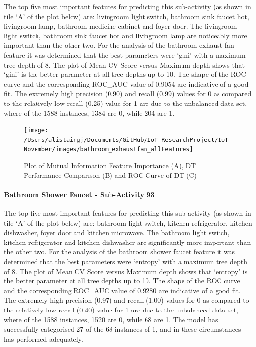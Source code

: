 \documentclass[11pt,]{article}
\let\oldparagraph\paragraph
\renewcommand{\paragraph}[1]{\oldparagraph{#1}\mbox{}}
\begin{document}
The top five most important features for predicting this sub-activity
(as shown in tile `A' of the plot below) are: livingroom light switch,
bathroom sink faucet hot, livingroom lamp, bathroom medicine cabinet and
foyer door. The livingroom light switch, bathroom sink faucet hot and
livingroom lamp are noticeably more important than the other two. For
the analysis of the bathroom exhaust fan feature it was determined that
the best parameters were `gini' with a maximum tree depth of 8. The plot
of Mean CV Score versus Maximum depth shows that `gini' is the better
parameter at all tree depths up to 10. The shape of the ROC curve and
the corresponding ROC\_AUC value of 0.9054 are indicative of a good fit.
The extremely high precision (0.90) and recall (0.99) values for 0 as
compared to the relatively low recall (0.25) value for 1 are due to the
unbalanced data set, where of the 1588 instances, 1384 are 0, while 204
are 1.

\begin{figure}[H]

{\centering \texttt{[image: /Users/alistairgj/Documents/GitHub/IoT\_ResearchProject/IoT\_November/images/bathroom\_exhaustfan\_allFeatures]} 

}

\caption{Plot of Mutual Information Feature Importance (A), DT Performance Comparison (B) and ROC Curve of DT (C)}\label{fig:unnamed-chunk-11}
\end{figure}

\hypertarget{bathroom-shower-faucet---sub-activity-93-1}{%
\paragraph{Bathroom Shower Faucet - Sub-Activity
93}\label{bathroom-shower-faucet---sub-activity-93-1}}

The top five most important features for predicting this sub-activity
(as shown in tile `A' of the plot below) are: bathroom light switch,
kitchen refrigerator, kitchen dishwasher, foyer door and kitchen
microwave. The bathroom light switch, kitchen refrigerator and kitchen
dishwasher are significantly more important than the other two. For the
analysis of the bathroom shower faucet feature it was determined that
the best parameters were `entropy' with a maximum tree depth of 8. The
plot of Mean CV Score versus Maximum depth shows that `entropy' is the
better parameter at all tree depths up to 10. The shape of the ROC curve
and the corresponding ROC\_AUC value of 0.9280 are indicative of a good
fit. The extremely high precision (0.97) and recall (1.00) values for 0
as compared to the relatively low recall (0.40) value for 1 are due to
the unbalanced data set, where of the 1588 instances, 1520 are 0, while
68 are 1. The model has successfully categorised 27 of the 68 instances
of 1, and in these circumstances has performed adequately.
\end{document}
